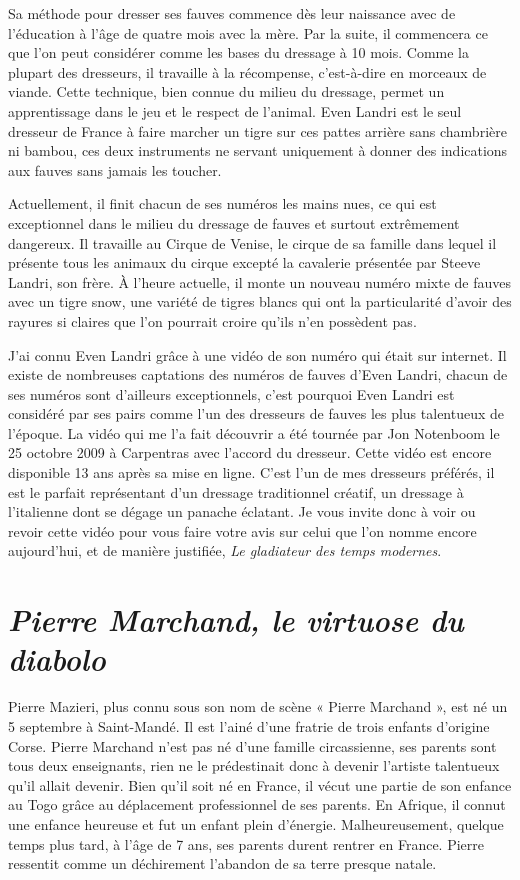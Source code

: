 Sa méthode pour dresser ses fauves commence dès leur naissance avec de l'éducation à l'âge de quatre mois avec la mère. Par la suite, il commencera ce que l'on peut considérer comme les bases du dressage à 10 mois. Comme la plupart des dresseurs, il travaille à la récompense, c'est-à-dire en morceaux de viande. Cette technique, bien connue du milieu du dressage, permet un apprentissage dans le jeu et le respect de l'animal. Even Landri est le seul dresseur de France à faire marcher un tigre sur ces pattes arrière sans chambrière ni bambou, ces deux instruments ne servant uniquement à donner des indications aux fauves sans jamais les toucher.

Actuellement, il finit chacun de ses numéros les mains nues, ce qui est exceptionnel dans le milieu du dressage de fauves et surtout extrêmement dangereux. Il travaille au Cirque de Venise, le cirque de sa famille dans lequel il présente tous les animaux du cirque excepté la cavalerie présentée par Steeve Landri, son frère. À l'heure actuelle, il monte un nouveau numéro mixte de fauves avec un tigre snow, une variété de tigres blancs qui ont la particularité d'avoir des rayures si claires que l'on pourrait croire qu'ils n'en possèdent pas.

J'ai connu Even Landri grâce à une vidéo de son numéro qui était sur internet. Il existe de nombreuses captations des numéros de fauves d'Even Landri, chacun de ses numéros sont d'ailleurs exceptionnels, c'est pourquoi Even Landri est considéré par ses pairs comme l'un des dresseurs de fauves les plus talentueux de l'époque. La vidéo qui me l'a fait découvrir a été tournée par Jon Notenboom le 25 octobre 2009 à Carpentras avec l'accord du dresseur. Cette vidéo est encore disponible 13 ans après sa mise en ligne. C'est l'un de mes dresseurs préférés, il est le parfait représentant d'un dressage traditionnel créatif, un dressage à l'italienne dont se dégage un panache éclatant. Je vous invite donc à voir ou revoir cette vidéo pour vous faire votre avis sur celui que l’on nomme encore aujourd'hui, et de manière justifiée, \textit{Le gladiateur des temps modernes}.

\section*{\textit{Pierre Marchand, le virtuose du diabolo}}
{}
\noindent
Pierre Mazieri, plus connu sous son nom de scène « Pierre Marchand », est né un 5 septembre à Saint-Mandé. Il est l'ainé d'une fratrie de trois enfants d'origine Corse. Pierre Marchand n'est pas né d'une famille circassienne, ses parents sont tous deux enseignants, rien ne le prédestinait donc à devenir l'artiste talentueux qu'il allait devenir. Bien qu'il soit né en France, il vécut une partie de son enfance au Togo grâce au déplacement professionnel de ses parents. En Afrique, il connut une enfance heureuse et fut un enfant plein d'énergie. Malheureusement, quelque temps plus tard, à l'âge de 7 ans, ses parents durent rentrer en France. Pierre ressentit comme un déchirement l'abandon de sa terre presque natale.

